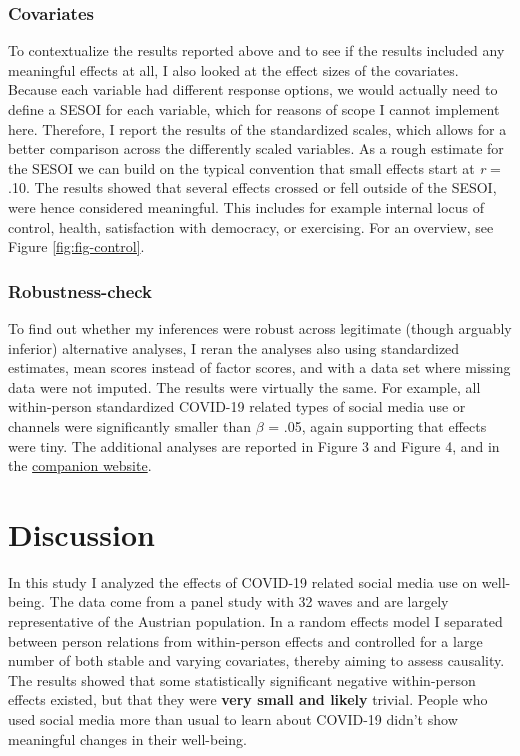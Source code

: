 \documentclass[
  man,mask]{apa7}
\begin{document}
\hypertarget{covariates}{%
\subsubsection{Covariates}\label{covariates}}

To contextualize the results reported above and to see if the results included any meaningful effects at all, I also looked at the effect sizes of the covariates.
Because each variable had different response options, we would actually need to define a SESOI for each variable, which for reasons of scope I cannot implement here.
Therefore, I report the results of the standardized scales,
which allows for a better comparison across the differently scaled variables.
As a rough estimate for the SESOI we can build on the typical convention that small effects start at \emph{r} = \textbar.10\textbar.
The results showed that several effects crossed or fell outside of the SESOI, were hence considered meaningful.
This includes for example internal locus of control, health, satisfaction with democracy, or exercising.
For an overview, see Figure \ref{fig:fig-control}.

\hypertarget{robustness-check}{%
\subsubsection{Robustness-check}\label{robustness-check}}

To find out whether my inferences were robust across legitimate (though arguably inferior) alternative analyses, I reran the analyses also using standardized estimates, mean scores instead of factor scores, and with a data set where missing data were not imputed.
The results were virtually the same.
For example, all within-person standardized COVID-19 related types of social media use or channels were significantly smaller than \(\beta\) = \textbar.05\textbar, again supporting that effects were tiny.
The additional analyses are reported in Figure 3 and Figure 4, and in the \href{https://XMtRA.github.io/Austrian_Corona_Panel_Project/analyses_additional.html}{companion website}.

\hypertarget{discussion}{%
\section{Discussion}\label{discussion}}

In this study I analyzed the effects of COVID-19 related social media use on well-being.
The data come from a panel study with 32 waves and are largely representative of the Austrian population.
In a random effects model I separated between person relations from within-person effects and controlled for a large number of both stable and varying covariates, thereby aiming to assess causality.
The results showed that some statistically significant negative within-person effects existed, but that they were \textbf{very small and likely} trivial.
People who used social media more than usual to learn about COVID-19 didn't show meaningful changes in their well-being.
\end{document}
